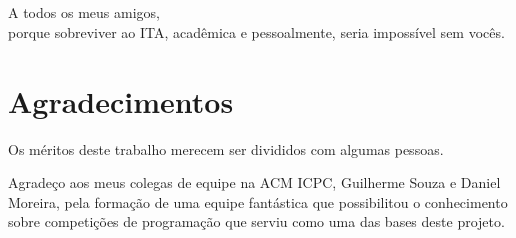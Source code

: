 \documentclass[ruledheader, 12pt]{abnt}
\begin{document}











%		
%	
%	

\chapter*{}

\vfill

\begin{flushright}
A todos os meus amigos,\\
porque sobreviver ao ITA, acadêmica e pessoalmente, seria impossível sem vocês.
\end{flushright}

\vfill

\chapter*{Agradecimentos}

Os méritos deste trabalho merecem ser divididos com algumas pessoas.

Agradeço aos meus colegas de equipe na ACM ICPC, Guilherme Souza e Daniel Moreira, pela formação de uma equipe fantástica que possibilitou o conhecimento sobre competições de programação que serviu como uma das bases deste projeto.
\end{document}
